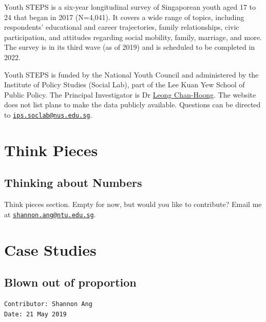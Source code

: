 \documentclass[
  openany]{book}
\begin{document}
Youth STEPS is a six-year longitudinal survey of Singaporean youth aged 17 to 24 that began in 2017 (N=4,041). It covers a wide range of topics, including respondents' educational and career trajectories, family relationships, civic participation, and attitudes regarding social mobility, family, marriage, and more. The survey is in its third wave (as of 2019) and is scheduled to be completed in 2022.

Youth STEPS is funded by the National Youth Council and administered by the Institute of Policy Studies (Social Lab), part of the Lee Kuan Yew School of Public Policy. The Principal Investigator is Dr \href{http://lkyspp.splashinteractive.sg/ips/about-us/staff-directory/leong-chan-hoong}{Leong Chan-Hoong}. The website does not list plans to make the data publicly available. Questions can be directed to \href{mailto:ips.soclab@nus.edu.sg}{\nolinkurl{ips.soclab@nus.edu.sg}}.

\hypertarget{part-think-pieces}{%
\part{Think Pieces}\label{part-think-pieces}}

\hypertarget{think}{%
\chapter{Thinking about Numbers}\label{think}}

Think pieces section. Empty for now, but would you like to contribute? Email me at \href{mailto:shannon.ang@ntu.edu.sg}{\nolinkurl{shannon.ang@ntu.edu.sg}}.

\hypertarget{part-case-studies}{%
\part{Case Studies}\label{part-case-studies}}

\hypertarget{oop}{%
\chapter{Blown out of proportion}\label{oop}}

\begin{verbatim}
Contributor: Shannon Ang
Date: 21 May 2019
\end{verbatim}
\end{document}
